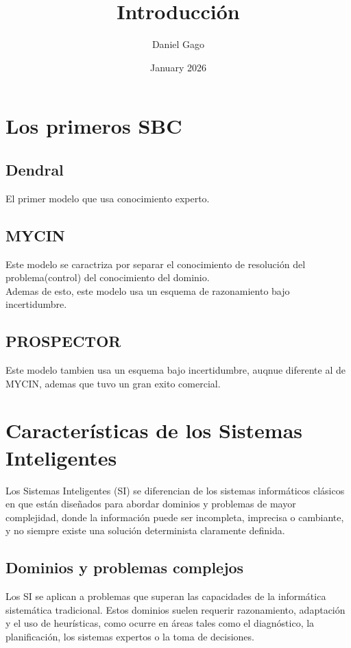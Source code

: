 \documentclass{article}
\title{Introducción}
\author{Daniel Gago}
\date{January 2026}
\begin{document}
\maketitle

\section{Los primeros SBC}
    \subsection{Dendral}
        El primer modelo que usa conocimiento experto.

    \subsection{MYCIN}
        Este modelo se caractriza por separar el conocimiento de resolución del problema(control) del conocimiento del dominio.\\

        Ademas de esto, este modelo usa un esquema de razonamiento bajo incertidumbre.\\

    \subsection{PROSPECTOR}
        Este modelo tambien usa un esquema bajo incertidumbre, auqnue diferente al de MYCIN, ademas que tuvo un gran exito comercial.

\section{Características de los Sistemas Inteligentes}

    Los Sistemas Inteligentes (SI) se diferencian de los sistemas informáticos clásicos en que están diseñados para abordar dominios y problemas de mayor complejidad, donde la información puede ser incompleta, imprecisa o cambiante, y no siempre existe una solución determinista claramente definida.
        
    \subsection{Dominios y problemas complejos}
        
    Los SI se aplican a problemas que superan las capacidades de la informática sistemática tradicional. Estos dominios suelen requerir razonamiento, adaptación y el uso de heurísticas, como ocurre en áreas tales como el diagnóstico, la planificación, los sistemas expertos o la toma de decisiones.
        
\end{document}
